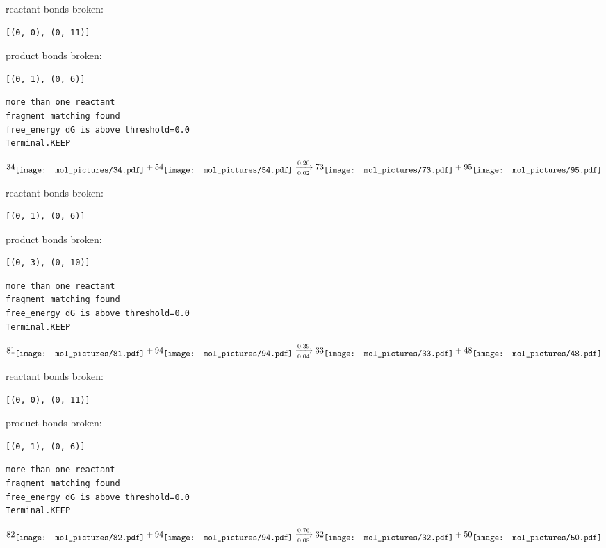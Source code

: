 \documentclass{article}
\begin{document}
reactant bonds broken:\begin{verbatim}
[(0, 0), (0, 11)]
\end{verbatim}
product bonds broken:\begin{verbatim}
[(0, 1), (0, 6)]
\end{verbatim}




\vspace{1cm}
\begin{verbatim}
more than one reactant
fragment matching found
free_energy dG is above threshold=0.0
Terminal.KEEP
\end{verbatim}
$$
34
\raisebox{-.5\height}{\texttt{[image: mol\_pictures/34.pdf]}}
+
54
\raisebox{-.5\height}{\texttt{[image: mol\_pictures/54.pdf]}}
\xrightarrow[0.02]{0.20}
73
\raisebox{-.5\height}{\texttt{[image: mol\_pictures/73.pdf]}}
+
95
\raisebox{-.5\height}{\texttt{[image: mol\_pictures/95.pdf]}}
$$


reactant bonds broken:\begin{verbatim}
[(0, 1), (0, 6)]
\end{verbatim}
product bonds broken:\begin{verbatim}
[(0, 3), (0, 10)]
\end{verbatim}




\vspace{1cm}
\begin{verbatim}
more than one reactant
fragment matching found
free_energy dG is above threshold=0.0
Terminal.KEEP
\end{verbatim}
$$
81
\raisebox{-.5\height}{\texttt{[image: mol\_pictures/81.pdf]}}
+
94
\raisebox{-.5\height}{\texttt{[image: mol\_pictures/94.pdf]}}
\xrightarrow[0.04]{0.39}
33
\raisebox{-.5\height}{\texttt{[image: mol\_pictures/33.pdf]}}
+
48
\raisebox{-.5\height}{\texttt{[image: mol\_pictures/48.pdf]}}
$$


reactant bonds broken:\begin{verbatim}
[(0, 0), (0, 11)]
\end{verbatim}
product bonds broken:\begin{verbatim}
[(0, 1), (0, 6)]
\end{verbatim}




\vspace{1cm}
\begin{verbatim}
more than one reactant
fragment matching found
free_energy dG is above threshold=0.0
Terminal.KEEP
\end{verbatim}
$$
82
\raisebox{-.5\height}{\texttt{[image: mol\_pictures/82.pdf]}}
+
94
\raisebox{-.5\height}{\texttt{[image: mol\_pictures/94.pdf]}}
\xrightarrow[0.08]{0.76}
32
\raisebox{-.5\height}{\texttt{[image: mol\_pictures/32.pdf]}}
+
50
\raisebox{-.5\height}{\texttt{[image: mol\_pictures/50.pdf]}}
$$
\end{document}
